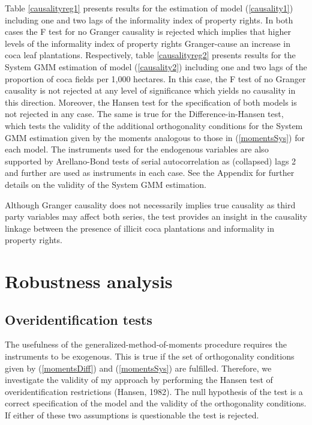 \documentclass[12pt,a4paper,english]{article}%
\begin{document}
Table \ref{causalityreg1} presents results for the estimation of model (\ref{causality1}) including one and two lags of the informality index of property rights. In both cases the F test for no Granger causality is rejected which implies that higher levels of the informality index of property rights Granger-cause an increase in coca leaf plantations. Respectively, table \ref{causalityreg2} presents results for the System GMM estimation of model (\ref{causality2}) including one and two lags of the proportion of coca fields per 1,000 hectares. In this case, the F test of no Granger causality is not rejected at any level of significance which yields no causality in this direction. Moreover, the Hansen test for the specification of both models is not rejected in any case. The same is true for the Difference-in-Hansen test, which tests the validity of the additional orthogonality conditions for the System GMM estimation given by the moments analogous to those in (\ref{momentsSys}) for each model. The instruments used for the endogenous variables are also supported by Arellano-Bond tests of serial autocorrelation as (collapsed) lags 2 and further are used as instruments in each case. See the Appendix for further details on the validity of the System GMM estimation.

Although Granger causality does not necessarily implies true causality as third party variables may affect both series, the test provides an insight in the causality linkage between the presence of illicit coca plantations and informality in property rights.

\section{Robustness analysis}

\subsection{Overidentification tests}
\label{overid}

The usefulness of the generalized-method-of-moments procedure requires the instruments to be exogenous. This is true if the set of orthogonality conditions given by (\ref{momentsDiff}) and (\ref{momentsSys}) are fulfilled. Therefore, we investigate the validity of my approach by performing the Hansen test of overidentification restrictions (Hansen, 1982). The null hypothesis of the test is a correct specification of the model and the validity of the orthogonality conditions. If either of these two assumptions is questionable the test is rejected.
\end{document}
